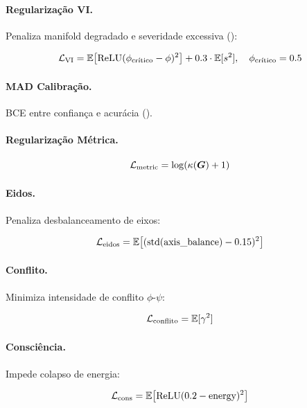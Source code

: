 \paragraph{Regulariza\c{c}\~ao VI.}
Penaliza manifold degradado e severidade excessiva ():

\begin{equation}
    \mathcal{L}_{\text{VI}} = \mathbb{E}\big[\text{ReLU}(\phi_{\text{cr\'itico}} - \phi)^2\big] + 0.3 \cdot \mathbb{E}[s^2], \quad \phi_{\text{cr\'itico}} = 0.5
\end{equation}

\paragraph{MAD Calibra\c{c}\~ao.}
BCE entre confian\c{c}a e acur\'acia ().

\paragraph{Regulariza\c{c}\~ao M\'etrica.}
\begin{equation}
    \mathcal{L}_{\text{metric}} = \log(\kappa(\bm{G}) + 1)
\end{equation}

\paragraph{Eidos.}
Penaliza desbalanceamento de eixos:

\begin{equation}
    \mathcal{L}_{\text{eidos}} = \mathbb{E}\big[(\text{std}(\text{axis\_balance}) - 0.15)^2\big]
\end{equation}

\paragraph{Conflito.}
Minimiza intensidade de conflito $\phi$-$\psi$:

\begin{equation}
    \mathcal{L}_{\text{conflito}} = \mathbb{E}[\gamma^2]
\end{equation}

\paragraph{Consci\^encia.}
Impede colapso de energia:

\begin{equation}
    \mathcal{L}_{\text{cons}} = \mathbb{E}\big[\text{ReLU}(0.2 - \text{energy})^2\big]
\end{equation}

